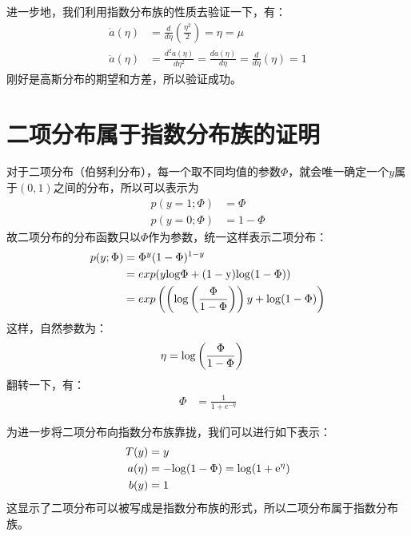 \documentclass[lang=cn,11pt,a4paper,cite=numbers]{elegantpaper}
\begin{document}
  进一步地，我们利用指数分布族的性质去验证一下，有：
\begin{equation}
  \begin{aligned}
    \dot{a}({\eta})&=\frac{d}{d{\eta}}(\frac{{\eta}^{2}}{2})={\eta}={\mu}\\
    \ddot{a}({\eta})&=\frac{d^{2}a({\eta})}{d{\eta}^{2}}=\frac{d\dot{a}({\eta})}{d{\eta}}=\frac{d}{d{\eta}}({\eta})=1
  \end{aligned}
\end{equation}
刚好是高斯分布的期望和方差，所以验证成功。

\section{二项分布属于指数分布族的证明}
  对于二项分布（伯努利分布），每一个取不同均值的参数$\Phi$，就会唯一确定一个$y$属于$(0,1)$之间的分布，所以可以表示为
\begin{equation}
  \begin{aligned}
    p(y=1;{\Phi})&={\Phi}\\
    p(y=0;{\Phi})&=1-{\Phi}
  \end{aligned}
\end{equation}
故二项分布的分布函数只以$\Phi$作为参数，统一这样表示二项分布：
\begin{equation}
  \begin{aligned}
    p(y;{\Phi})&={\Phi}^{y}(1-{\Phi})^{1-y}\\
               &=exp(y\rm{log}{\Phi}+(1-y)\rm{log}(1-{\Phi}))\\
               &=exp\left(\left(\rm{log}\left(\frac{{\Phi}}{1-{\Phi}}\right)\right)y+\rm{log}(1-{\Phi})\right)
  \end{aligned}
\end{equation}
这样，自然参数为：
\begin{equation}
  \begin{aligned}
    {\eta}&=\rm{log}\left(\frac{{\Phi}}{1-{\Phi}}\right)
  \end{aligned}
\end{equation}
翻转一下，有：
\begin{equation}
  \begin{aligned}
    {\Phi}&=\frac{1}{1+e^{-{\eta}}}
  \end{aligned}
\end{equation}

  为进一步将二项分布向指数分布族靠拢，我们可以进行如下表示：
\begin{equation}
  \begin{aligned}
    T(y)&=y\\
    a({\eta})&=-\rm{log}(1-{\Phi})=\rm{log}(1+e^{\eta})\\
    b(y)&=1
  \end{aligned}
\end{equation}
这显示了二项分布可以被写成是指数分布族的形式，所以二项分布属于指数分布族。
\end{document}
